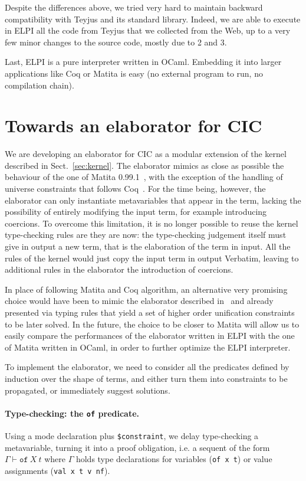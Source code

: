 \documentclass{easychair}
\begin{document}
Despite the differences above, we tried very hard to maintain backward
compatibility with Teyjus and its standard library. Indeed, we are able to
execute in ELPI all the code from Teyjus that we collected from the Web, up to
a very few minor changes to the source code, mostly due to 2 and 3.

Last, ELPI is a pure interpreter written in OCaml.  Embedding it into
larger applications like Coq or Matita is easy (no external program to
run, no compilation chain).


\section{Towards an elaborator for CIC}\label{sec:elaborator}
We are developing an elaborator for CIC as a modular extension of the kernel described in Sect.~\ref{sec:kernel}. The elaborator mimics as close as possible the behaviour of the one of Matita 0.99.1~\cite{bidir}, with the exception of the handling of universe constraints that follows Coq~\cite{algebraic}. For the time being, however, the elaborator can only instantiate metavariables that appear in the term, lacking the possibility of entirely modifying the input term, for example introducing coercions. To overcome this limitation, it is no longer possible to reuse the kernel type-checking rules are they are now: the type-checking judgement itself must give in output a new term, that is the elaboration of the term in input. All the rules of the kernel would just copy the input term in output Verbatim, leaving to additional rules in the elaborator the introduction of coercions.

In place of following Matita and Coq algorithm, an alternative very promising choice would have been to mimic the elaborator described in~\cite{abel} and already presented via typing rules that yield a set of higher order unification constraints to be later solved. In the future, the choice to be closer to Matita will allow us to easily compare the performances of the elaborator written in ELPI with the one of Matita written in OCaml, in order to further optimize the ELPI interpreter.

To implement the elaborator, we need to consider all the predicates defined by induction over the shape of terms, and either turn them into constraints to be propagated, or immediately suggest solutions.

\paragraph{Type-checking: the \texttt{of} predicate.}
Using a mode declaration plus \verb+$constraint+, we delay type-checking a
metavariable, turning it into a proof obligation, i.e. a sequent of the form $\Gamma \vdash \mathtt{of}~X~t$ where $\Gamma$ holds type declarations for variables (\verb+of x t+) or value assignments (\verb+val x t v nf+).
\end{document}
